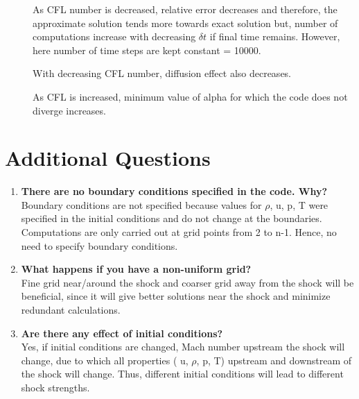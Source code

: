 \documentclass{article}
\begin{document}
\begin{description}
\item[]As CFL number is decreased, relative error decreases and therefore, the approximate solution tends more towards exact solution but, number of computations increase with decreasing $\delta t$ if final time remains. However, here number of time steps are kept constant = 10000.
\item[] With decreasing CFL number, diffusion effect also decreases.
\item[] As CFL is increased, minimum value of alpha for which the code does not diverge increases.
\end{description}

\newpage

\section*{Additional Questions}
\begin{enumerate}
  \item \textbf{There are no boundary conditions specified in the code. Why?}
\\
  Boundary conditions are not specified because values for $\rho$, u, p, T were specified in the initial conditions and do not change at the boundaries. Computations are only carried out at grid points from 2 to n-1. Hence, no need to specify boundary conditions.
  \item \textbf{What happens if you have a non-uniform grid?}
\\
  Fine grid near/around the shock and coarser grid away from the shock will be beneficial, since it will give better solutions near the shock and minimize redundant calculations.
  \item \textbf{Are there any effect of initial conditions?}
\\ 
 Yes, if initial conditions are changed, Mach number upstream the shock will change, due to which all properties ( u, $\rho$, p, T) upstream and downstream of the shock will change. Thus, different initial conditions will lead to different shock strengths.
\end{enumerate}
\end{document}
